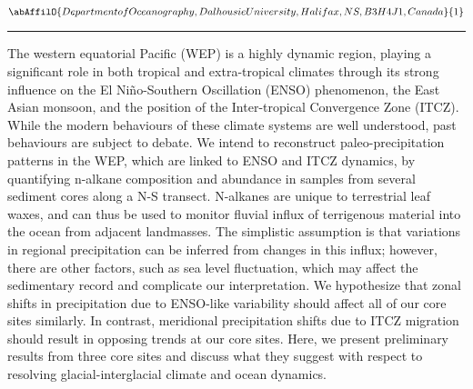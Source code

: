 \begin{minipage}{\linewidth}\begin{center}\begin{minipage}{\linewidth}
   \vspace{2 mm} \begin{center}
    \vspace{2 mm}\begin{center}
  
  $\abAffilO{Department of Oceanography, Dalhousie University, Halifax, NS, B3H 4J1, Canada}{1}$

  \end{center}
  \vspace{2 mm}
  \end{center}\end{minipage}\end{center}
  \begin{center}\rule{0.70\linewidth}{0.5 pt}\end{center}
  \begin{minipage}{\linewidth}
\noindent The western equatorial Pacific (WEP) is a highly dynamic region, playing a significant role in both tropical and extra-tropical climates through its strong influence on the El Ni\~{n}o-Southern Oscillation (ENSO) phenomenon, the East Asian monsoon, and the position of the Inter-tropical Convergence Zone (ITCZ).  While the modern behaviours of these climate systems are well understood, past behaviours are subject to debate.  We intend to reconstruct paleo-precipitation patterns in the WEP, which are linked to ENSO and ITCZ dynamics, by quantifying n-alkane composition and abundance in samples from several sediment cores along a N-S transect.  N-alkanes are unique to terrestrial leaf waxes, and can thus be used to monitor fluvial influx of terrigenous material into the ocean from adjacent landmasses.  The simplistic assumption is that variations in regional precipitation can be inferred from changes in this influx; however, there are other factors, such as sea level fluctuation, which may affect the sedimentary record and complicate our interpretation.  We hypothesize that zonal shifts in precipitation due to ENSO-like variability should affect all of our core sites similarly.  In contrast, meridional precipitation shifts due to ITCZ migration should result in opposing trends at our core sites.  Here, we present preliminary results from three core sites and discuss what they suggest with respect to resolving glacial-interglacial climate and ocean dynamics.           
\end{minipage}\end{minipage}
